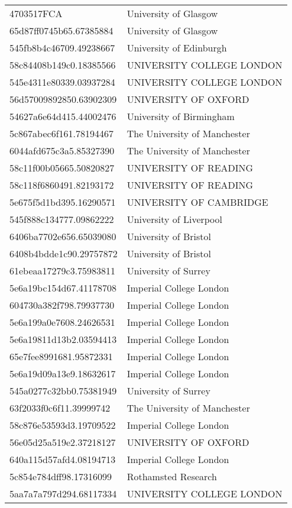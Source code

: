 \begin{tabular}{ll}
4703517FCA & University of Glasgow \\
65d87ff0745b65.67385884 & University of Glasgow \\
545fb8b4c46709.49238667 & University of Edinburgh \\
58c84408b149c0.18385566 & UNIVERSITY COLLEGE LONDON \\
545e4311e80339.03937284 & UNIVERSITY COLLEGE LONDON \\
56d57009892850.63902309 & UNIVERSITY OF OXFORD \\
54627a6e64d415.44002476 & University of Birmingham \\
5c867abec6f161.78194467 & The University of Manchester \\
6044afd675c3a5.85327390 & The University of Manchester \\
58c11f00b05665.50820827 & UNIVERSITY OF READING \\
58c118f6860491.82193172 & UNIVERSITY OF READING \\
5e675f5d1bd395.16290571 & UNIVERSITY OF CAMBRIDGE \\
545f888c134777.09862222 & University of Liverpool \\
6406ba7702e656.65039080 & University of Bristol \\
6408b4bdde1c90.29757872 & University of Bristol \\
61ebeaa17279c3.75983811 & University of Surrey \\
5e6a19bc154d67.41178708 & Imperial College London \\
604730a382f798.79937730 & Imperial College London \\
5e6a199a0e7608.24626531 & Imperial College London \\
5e6a19811d13b2.03594413 & Imperial College London \\
65e7fee8991681.95872331 & Imperial College London \\
5e6a19d09a13e9.18632617 & Imperial College London \\
545a0277c32bb0.75381949 & University of Surrey \\
63f2033f0c6f11.39999742 & The University of Manchester \\
58c876e53593d3.19709522 & Imperial College London \\
56e05d25a519e2.37218127 & UNIVERSITY OF OXFORD \\
640a115d57afd4.08194713 & Imperial College London \\
5c854e784dff98.17316099 & Rothamsted Research \\
5aa7a7a797d294.68117334 & UNIVERSITY COLLEGE LONDON \\

\end{tabular}

